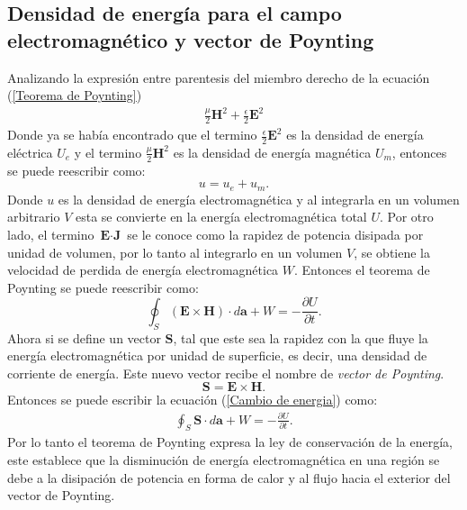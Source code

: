 \documentclass[11pt,fleqn]{book} %
\begin{document}
\subsection{Densidad de energ\'ia para el campo electromagn\'etico y vector de Poynting}
Analizando la expresi\'on entre parentesis del miembro derecho de la ecuaci\'on (\ref{Teorema de Poynting})
\begin{eqnarray*}
\frac{\mu}{2}\textbf{H}^{2}+\frac{\epsilon}{2}\textbf{E}^{2}
\end{eqnarray*}
Donde ya se hab\'ia encontrado que el termino $\frac{\epsilon}{2}\textbf{E}^{2}$ es la densidad de energ\'ia el\'ectrica $U_{e}$ y el termino $\frac{\mu}{2}\textbf{H}^{2}$ es la densidad de energ\'ia magn\'etica $U_{m}$, entonces se puede reescribir como:
\begin{equation}
u=u_{e}+u_{m}.
\end{equation}
Donde $u$ es la densidad de energ\'ia electromagn\'etica y al integrarla en un volumen arbitrario $V$ esta se convierte en la energ\'ia electromagn\'etica total $U$. Por otro lado, el termino $\textbf{E}\cdot\textbf{J}$ se le conoce como la rapidez de potencia disipada por unidad de volumen, por lo tanto al integrarlo en un volumen $V$, se obtiene la velocidad de perdida de energ\'ia electromagn\'etica $W$.
Entonces el teorema de Poynting se puede reescribir como:
\begin{equation}
\oint_{S}(\textbf{E}\times\textbf{H})\cdot d\textbf{a}+W=-\frac{\partial U}{\partial t}. \label{Cambio de energia}
\end{equation}
Ahora si se define un vector $\textbf{S}$, tal que este sea la rapidez con la que fluye la energ\'ia electromagn\'etica por unidad de superficie, es decir, una densidad de corriente de energ\'ia. Este nuevo vector recibe el nombre de \textit{vector de Poynting}.
\begin{equation}
\textbf{S}=\textbf{E}\times\textbf{H}.  \label{Vector S}
\end{equation}
Entonces se puede escribir la ecuaci\'on (\ref{Cambio de energia}) como:
\begin{eqnarray*}
\oint_{S}\textbf{S}\cdot d\textbf{a}+W=-\frac{\partial U}{\partial t}.
\end{eqnarray*}
Por lo tanto el teorema de Poynting expresa la ley de conservaci\'on de la energ\'ia, este establece que la disminuci\'on de energ\'ia electromagn\'etica en una regi\'on se debe a la disipaci\'on de potencia en forma de calor y al flujo hacia el exterior del vector de Poynting.\\
\end{document}
